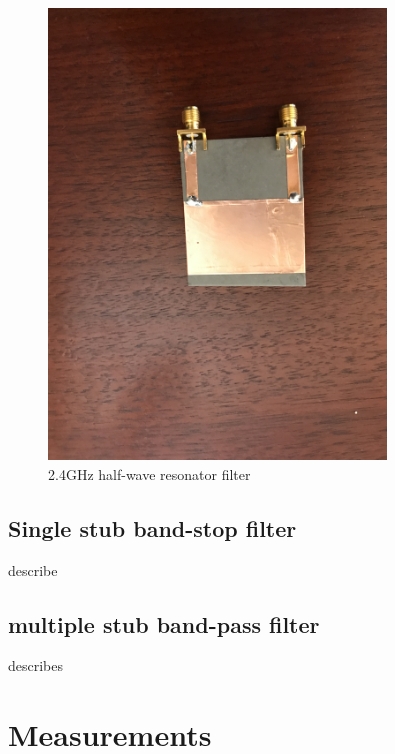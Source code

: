 \documentclass[letterpaper, 12pt]{article}
\begin{document}
\begin{figure}[H]
    \centering
    \includegraphics[width=0.8\textwidth, angle = 270]{filter2}
    \caption{2.4GHz half-wave resonator filter}
\end{figure}

\subsection{Single stub band-stop filter}
describe
\subsection{multiple stub band-pass filter}
describes
\section{Measurements}
\end{document}
